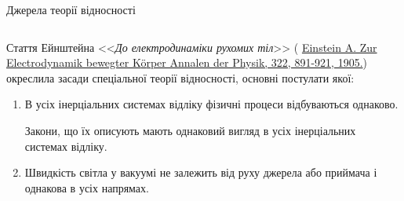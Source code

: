 \documentclass[]{beamer}
\begin{document}
\begin{frame}{Джерела теорії відносності}{}\small
	\begin{columns}
		\begin{column}{0.5\linewidth}
			\begin{block}{}\justifying
				Стаття Ейнштейна <<\emph{\color{blue}До електродинаміки рухомих тіл}>> ({\scriptsize
						\href{https://onlinelibrary.wiley.com/doi/10.1002/andp.19053221004}{Einstein A. Zur Electrodynamik bewegter K{\"o}rper Annalen der Physik,
							322, 891-921, 1905.}}) окреслила засади спеціальної теорії відносності, основні постулати якої:

				\begin{enumerate}\footnotesize\justifying
					\item В усіх інерціальних системах відліку фізичні процеси відбуваються однаково.

					      \begin{flushleft}\color{red}
						      Закони, що їх описують мають однаковий вигляд  в усіх інерціальних системах відліку.
					      \end{flushleft}

					\item Швидкість світла у вакуумі не залежить від руху джерела або приймача і однакова в усіх напрямах.
				\end{enumerate}


\end{block}
\end{column}
\end{columns}
\end{frame}
\end{document}
